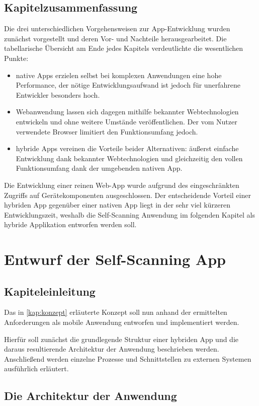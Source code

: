 \section{Kapitelzusammenfassung}
Die drei unterschiedlichen Vorgehensweisen zur App-Entwicklung wurden zunächst vorgestellt und deren Vor- und Nachteile herausgearbeitet. Die tabellarische Übersicht am Ende jedes Kapitels verdeutlichte die wesentlichen Punkte:
\begin{itemize}
	\item native Apps erzielen selbst bei komplexen Anwendungen eine hohe Performance, der nötige Entwicklungsaufwand ist jedoch für unerfahrene Entwickler besonders hoch.
	\item Webanwendung lassen sich dagegen mithilfe bekannter Webtechnologien entwickeln und ohne weitere Umstände veröffentlichen. Der vom Nutzer verwendete Browser limitiert den Funktionsumfang jedoch.
	\item hybride Apps vereinen die Vorteile beider Alternativen: äußerst einfache Entwicklung dank bekannter Webtechnologien und gleichzeitig den vollen Funktionsumfang dank der umgebenden nativen App.
\end{itemize} 

Die Entwicklung einer reinen Web-App wurde aufgrund des eingeschränkten Zugriffs auf Gerätekomponenten ausgeschlossen. Der entscheidende Vorteil einer hybriden App gegenüber einer nativen App liegt in der sehr viel kürzeren Entwicklungszeit, weshalb die Self-Scanning Anwendung im folgenden Kapitel als hybride Applikation entworfen werden soll.

\chapter{Entwurf der Self-Scanning App}
\section{Kapiteleinleitung}
Das in \vref{kap:konzept} erläuterte Konzept soll nun anhand der ermittelten Anforderungen als mobile Anwendung entworfen und implementiert werden.

Hierfür soll zunächst die grundlegende Struktur einer hybriden App und die daraus resultierende Architektur der Anwendung beschrieben werden. Anschließend werden einzelne Prozesse und Schnittstellen zu externen Systemen ausführlich erläutert.

\section{Die Architektur der Anwendung}
